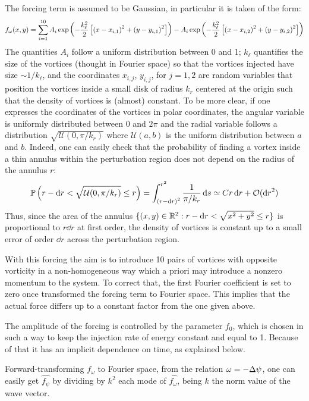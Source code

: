 \documentclass[../main.tex]{subfiles}
\begin{document}
The forcing term is assumed to be Gaussian, in particular it is taken of the form:
\begin{equation}
	f_\omega(x,y) = \sum_{i=1}^{10} A_i \operatorname{exp}\left(-\frac{k_\ell^2}{2}\left[{(x-x_{i,1})}^2 + {(y-y_{i,1})}^2\right]\right) - A_i\operatorname{exp}\left(-\frac{k_\ell^2}{2}\left[{(x-x_{i,2})}^2 + {(y-y_{i,2})}^2\right]\right)
\end{equation}
The quantities $A_i$ follow a uniform distribution between 0 and 1; $k_\ell$ quantifies the size of the vortices (thought in Fourier space) so that the vortices injected have size $\sim 1/k_\ell$, and the coordinates $x_{i,j}$, $y_{i,j}$, for $j=1,2$ are random variables that position the vortices inside a small disk of radius $k_r$ centered at the origin such that the density of vortices is (almost) constant. To be more clear, if one expresses the coordinates of the vortices in polar coordinates, the angular variable is uniformly distributed between 0 and $2\pi$ and the radial variable follows a distribution $\sqrt{\mathcal{U}(0,\pi/k_r)}$ where $\mathcal{U}(a,b)$ is the uniform distribution between $a$ and $b$. Indeed, one can easily check that the probability of finding a vortex inside a thin annulus within the perturbation region does not depend on the radius of the annulus $r$:
\begin{equation}
	\mathbb{P}\left(r-\dd{r} < \sqrt{\mathcal{U}(0,\pi/k_r)} \leq r\right) = \int_{{(r-\dd{r})}^2}^{r^2} \frac{1}{\pi/k_r} \dd{s} \simeq C r \dd{r} + \mathcal{O}(\dd{r}^2)
\end{equation}
Thus, since the area of the annulus $\{(x,y) \in \mathbb{R}^2 : r-\dd{r} < \sqrt{x^2+y^2} \leq r\}$ is proportional to $r \dd{r}$ at first order, the density of vortices is constant up to a small error of order $\dd{r}$ across the perturbation region.

With this forcing the aim is to introduce 10 pairs of vortices with opposite vorticity in a non-homogeneous way which a priori may introduce a nonzero momentum to the system. To correct that, the first Fourier coefficient is set to zero once transformed the forcing term to Fourier space. This implies that the actual force differs up to a constant factor from the one given above.

The amplitude of the forcing is controlled by the parameter $f_0$, which is chosen in such a way to keep the injection rate of energy constant and equal to 1. Because of that it has an implicit dependence on time, as explained below.

Forward-transforming $f_\omega$ to Fourier space, from the relation $\omega = -\Delta \psi$, one can easily get $\widehat{f_\psi}$ by dividing by $k^2$ each mode of $\widehat{f_\omega}$, being $k$ the norm value of the wave vector.
\end{document}
